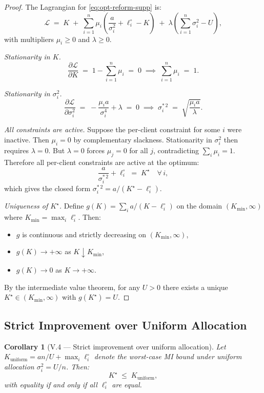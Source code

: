 \documentclass[letterpaper,journal]{IEEEtran}
\newtheorem*{corollarystar}{Corollary}
\begin{document}
\begin{proof}
The Lagrangian for \eqref{eq:opt-reform-supp} is:
\[
\mathcal{L}
\;=\; K
\;+\; \sum_{i=1}^n \mu_i
      \!\left(\frac{a}{\sigma_i^2} + \ell_i^\circ - K\right)
\;+\; \lambda\!\left(\sum_{i=1}^n \sigma_i^2 - U\right),
\]
with multipliers $\mu_i \geq 0$ and $\lambda \geq 0$.

\medskip
\noindent\textit{Stationarity in $K$.}
\[
\frac{\partial \mathcal{L}}{\partial K}
\;=\; 1 - \sum_{i=1}^n \mu_i \;=\; 0
\;\implies\;
\sum_{i=1}^n \mu_i \;=\; 1.
\]

\noindent\textit{Stationarity in $\sigma_i^2$.}
\[
\frac{\partial \mathcal{L}}{\partial \sigma_i^2}
\;=\; -\frac{\mu_i a}{\sigma_i^4} + \lambda \;=\; 0
\;\implies\;
\sigma_i^{*\,2} \;=\; \sqrt{\frac{\mu_i a}{\lambda}}.
\]

\noindent\textit{All constraints are active.}
Suppose the per-client constraint for some $i$ were inactive.
Then $\mu_i = 0$ by complementary slackness. Stationarity
in $\sigma_i^2$ then requires $\lambda = 0$. But $\lambda = 0$
forces $\mu_j = 0$ for all $j$, contradicting $\sum_i \mu_i =
1$. Therefore all per-client constraints are active at the
optimum:
\[
\frac{a}{\sigma_i^{*\,2}} + \ell_i^\circ \;=\; K^\star
\quad \forall\, i,
\]
which gives the closed form
$\sigma_i^{*\,2} = a/(K^\star - \ell_i^\circ)$.

\medskip
\noindent\textit{Uniqueness of $K^\star$.}
Define $g(K) = \sum_i a/(K - \ell_i^\circ)$ on the domain
$(K_{\min}, \infty)$ where $K_{\min} = \max_i \ell_i^\circ$.
Then:
\begin{itemize}
\item $g$ is continuous and strictly decreasing on
      $(K_{\min}, \infty)$,
\item $g(K) \to +\infty$ as $K \downarrow K_{\min}$,
\item $g(K) \to 0$ as $K \to +\infty$.
\end{itemize}
By the intermediate value theorem, for any $U > 0$ there exists
a unique $K^\star \in (K_{\min}, \infty)$ with
$g(K^\star) = U$.
\end{proof}

\subsection{Strict Improvement over Uniform Allocation}

\begin{corollarystar}[V.4 \textnormal{---} Strict improvement
over uniform allocation]
Let $K_{\mathrm{uniform}} = an/U + \max_i \ell_i^\circ$ denote
the worst-case MI bound under uniform allocation
$\sigma_i^2 = U/n$. Then:
\[
K^\star \;\leq\; K_{\mathrm{uniform}},
\]
with equality if and only if all $\ell_i^\circ$ are equal.
\end{corollarystar}
\end{document}

